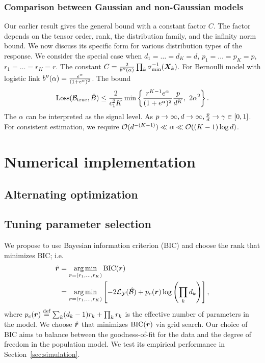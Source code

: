 \documentclass[twoside]{article}
\theoremstyle{plain}
\theoremstyle{definition}
\begin{document}
\subsubsection{Comparison between Gaussian and non-Gaussian models}
Our earlier result gives the general bound with a constant factor $C$. The factor depends on the tensor order, rank, the distribution family, and the infinity norm bound. We now discuss its specific form for various distribution types of the response. 
We consider the special case when $d_1=\ldots=d_K=d$, $p_1=\ldots=p_K=p$, $r_1=\ldots=r_K=r$. 
The constant $C={2\over b''(\alpha)} \prod_k\sigma^{-1}_{\min}(\bm X_k)$. For Bernoulli model with logistic link $b''(\alpha)={e^\alpha\over (1+e^\alpha)^2}$. 
The bound
\[
\text{Loss}(\trueB,\hat B)\leq {2\over c_1^2K}\min\left\{ {r^{K-1} e^\alpha\over (1+e^\alpha)^2} {p\over d^K},\ 2\alpha^2 \right\}.
\]
The $\alpha$ can be interpreted as the signal level. As $p\to\infty, d\to\infty, {p\over d} \to \gamma\in[0,1]$. For consistent estimation, we require $\mathcal{O}(d^{-(K-1)})\ll \alpha\ll \mathcal{O}((K-1)\log d)$. 


\section{Numerical implementation}
\subsection{Alternating optimization}


\subsection{Tuning parameter selection}\label{sec:tuning}
We propose to use Bayesian information criterion (BIC) and choose the rank that minimizes BIC; i.e.
\begin{align}
\hat {\bm{r}}&=\operatorname*{arg\,min}_{\bm{r}=(r_1,\ldots,r_K)} \text{BIC}(\bm{r})\\
&=\operatorname*{arg\,min}_{\bm{r}=(r_1,\ldots,r_K)}\left[-2\mathcal{L}_{\mathcal{Y}}(\hat {\mathcal{B}})+p_e(\bm{r})\log \left(\prod_k d_k\right) \right],
\end{align}
where $p_e(\bm{r})\stackrel{\text{def}}{=}\sum_k (d_k-1)r_k+\prod_k r_k$ is the effective number of parameters in the model. We choose $\hat {\bm{r}}$ that minimizes $\text{BIC}(\bm{r})$ via grid search. Our choice of BIC aims to balance between the goodness-of-fit for the data and the degree of freedom in the population model. We test its empirical performance in Section~\ref{sec:simulation}.  
\end{document}
